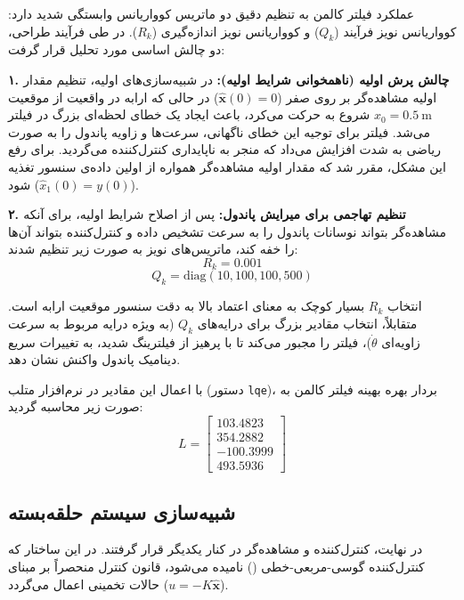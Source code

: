 \documentclass[a4paper,12pt]{article}
\begin{document}
عملکرد فیلتر کالمن به تنظیم دقیق دو ماتریس کوواریانس وابستگی شدید دارد: کوواریانس نویز فرآیند ($Q_k$) و کوواریانس نویز اندازه‌گیری ($R_k$). در طی فرآیند طراحی، دو چالش اساسی مورد تحلیل قرار گرفت:

\textbf{۱. چالش پرش اولیه (ناهمخوانی شرایط اولیه):} در شبیه‌سازی‌های اولیه، تنظیم مقدار اولیه مشاهده‌گر بر روی صفر ($\hat{\mathbf{x}}(0) = 0$) در حالی که ارابه در واقعیت از موقعیت $x_0 = 0.5~\mathrm{m}$ شروع به حرکت می‌کرد، باعث ایجاد یک خطای لحظه‌ای بزرگ در فیلتر می‌شد. فیلتر برای توجیه این خطای ناگهانی، سرعت‌ها و زاویه پاندول را به صورت ریاضی به شدت افزایش می‌داد که منجر به ناپایداری کنترل‌کننده می‌گردید. برای رفع این مشکل، مقرر شد که مقدار اولیه مشاهده‌گر همواره از اولین داده‌ی سنسور تغذیه شود ($\hat{x}_1(0) = y(0)$).

\textbf{۲. تنظیم تهاجمی برای میرایش پاندول:} پس از اصلاح شرایط اولیه، برای آنکه مشاهده‌گر بتواند نوسانات پاندول را به سرعت تشخیص داده و کنترل‌کننده  بتواند آن‌ها را خفه کند، ماتریس‌های نویز به صورت زیر تنظیم شدند:
\begin{equation}
    R_k = 0.001
\end{equation}
\begin{equation}
    Q_k = \mathrm{diag}(10, 100, 100, 500)
\end{equation}

انتخاب $R_k$ بسیار کوچک به معنای اعتماد بالا به دقت سنسور موقعیت ارابه است. متقابلاً، انتخاب مقادیر بزرگ برای درایه‌های $Q_k$ (به ویژه درایه مربوط به سرعت زاویه‌ای $\dot{\theta}$)، فیلتر را مجبور می‌کند تا با پرهیز از فیلترینگ شدید، به تغییرات سریع دینامیک پاندول واکنش نشان دهد.

با اعمال این مقادیر در نرم‌افزار متلب (دستور \texttt{lqe})، بردار بهره بهینه فیلتر کالمن به صورت زیر محاسبه گردید:
\begin{equation}
    L =
    \begin{bmatrix}
        103.4823  \\
        354.2882  \\
        -100.3999 \\
        493.5936
    \end{bmatrix}
\end{equation}

\subsection{شبیه‌سازی سیستم  حلقه‌بسته}

در نهایت، کنترل‌کننده و مشاهده‌گر در کنار یکدیگر قرار گرفتند. در این ساختار که کنترل‌کننده گوسی-مربعی-خطی () نامیده می‌شود، قانون کنترل منحصراً بر مبنای حالات تخمینی اعمال می‌گردد ($u = -K\hat{\mathbf{x}}$).
\end{document}
